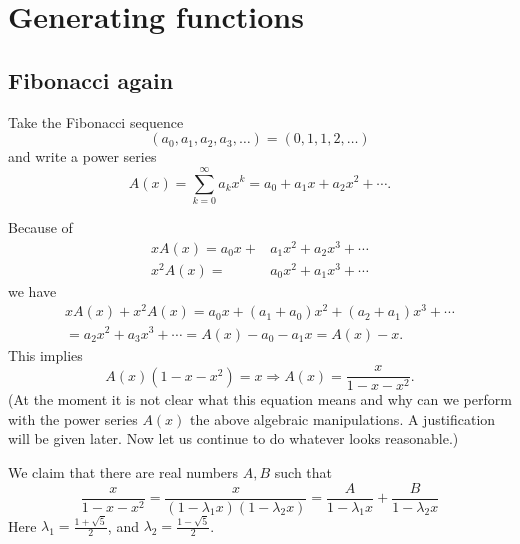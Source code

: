 \begin{page}
\setcounter{section}{2}
\setcounter{subsection}{1}
\setcounter{dfn}{0}
\label{portion:816}

\section{Generating functions}


\end{page}

\begin{page}
\setcounter{section}{2}
\setcounter{subsection}{2}
\setcounter{dfn}{0}
\label{portion:818}

\subsection{Fibonacci again}
\label{sec:FibAgain}
Take the Fibonacci sequence
\[
(a_0, a_1, a_2, a_3, \ldots) = (0, 1, 1, 2, \ldots)
\]
and write a power series
\[
A(x) = \sum_{k=0}^\infty a_k x^k = a_0 + a_1 x + a_2 x^2 + \cdots.
\]

Because of
\begin{align*}
xA(x)  = a_0x + & a_1x^2 + a_2x^3 + \cdots\\
x^2A(x)  = & a_0x^2 + a_1x^3 + \cdots
\end{align*}
we have
\begin{multline*}
xA(x) + x^2A(x) = a_0 x + (a_1+a_0)x^2 + (a_2+a_1)x^3 + \cdots\\
= a_2x^2 + a_3x^3 + \cdots = A(x) - a_0 - a_1 x = A(x) - x.
\end{multline*}
This implies
\[
A(x)(1-x-x^2) = x \Rightarrow A(x) = \frac{x}{1-x-x^2}.
\]
(At the moment it is not clear what this equation means and why can we perform with the power series $A(x)$ the above algebraic manipulations.
A justification will be given later. Now let us continue to do whatever looks reasonable.)

We claim that there are real numbers $A, B$ such that
\[
\frac{x}{1-x-x^2} = \frac{x}{(1-\lambda_1x)(1-\lambda_2x)} = \frac{A}{1-\lambda_1x} + \frac{B}{1-\lambda_2x}
\]
Here $\lambda_1 = \frac{1+\sqrt{5}}2$, and $\lambda_2 = \frac{1-\sqrt{5}}2$.


\end{page}
